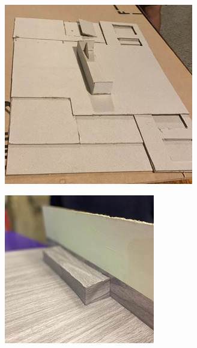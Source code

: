 \documentclass[12pt]{article} %
\begin{document}
\begin{center}
\begin{minipage}[b]{0.45\textwidth}
  \centering
  \includegraphics[width=\linewidth]{Pictures/recortes_maqueta.jpeg}
  \label{fig:recortes}
\end{minipage}
\hspace{0.5cm} %
\begin{minipage}[b]{0.45\textwidth}
  \centering
  \includegraphics[width=\linewidth]{Pictures/proceso_maqueta_1.jpeg}
  \label{fig:proceso1}
\end{minipage}


\end{center}
\end{document}
